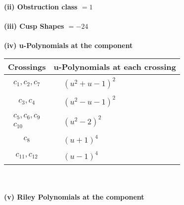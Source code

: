\documentclass[1p]{elsarticle_modified}
\theoremstyle{definition}
\begin{document}
\flushleft \textbf{(ii) Obstruction class $= 1$}\\~\\
\flushleft \textbf{(iii) Cusp Shapes $= -24$}\\~\\
\newpage\renewcommand{\arraystretch}{1}
\flushleft \textbf{(iv) u-Polynomials at the component}\newline \\
\begin{tabular}{m{50pt}|m{274pt}}
Crossings & \hspace{64pt}u-Polynomials at each crossing \\
\hline $$\begin{aligned}c_{1},c_{2},c_{7}\end{aligned}$$&$\begin{aligned}
&(u^2+u-1)^2
\end{aligned}$\\
\hline $$\begin{aligned}c_{3},c_{4}\end{aligned}$$&$\begin{aligned}
&(u^2- u-1)^2
\end{aligned}$\\
\hline $$\begin{aligned}c_{5},c_{6},c_{9}\\c_{10}\end{aligned}$$&$\begin{aligned}
&(u^2-2)^2
\end{aligned}$\\
\hline $$\begin{aligned}c_{8}\end{aligned}$$&$\begin{aligned}
&(u+1)^4
\end{aligned}$\\
\hline $$\begin{aligned}c_{11},c_{12}\end{aligned}$$&$\begin{aligned}
&(u-1)^4
\end{aligned}$\\
\hline
\end{tabular}\\~\\
\newpage\renewcommand{\arraystretch}{1}
\flushleft \textbf{(v) Riley Polynomials at the component}\newline \\
\end{document}
